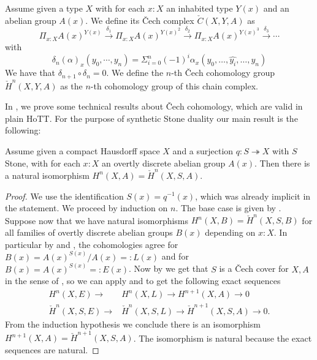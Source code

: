\begin{definition}\label{dfnCech}
Assume given a type $X$ with for each $x:X$ an inhabited type $Y(x)$ and an abelian group $A(x)$. We define its \v{C}ech complex $\check{C}(X,Y,A)$ as
\[\Pi_{x:X}A(x)^{Y(x)} \overset{\delta_1}{\longrightarrow} \Pi_{x:X}A(x)^{Y(x)^2} \overset{\delta_2}{\longrightarrow} \Pi_{x:X}A(x)^{Y(x)^3} \overset{\delta_3}{\longrightarrow} \cdots \]
with
\[\delta_n(\alpha)_x(y_0,\cdots,y_n) = \Sigma_{i=0}^n (-1)^i \alpha_x(y_0,\hdots,\hat{y_i},\hdots,y_n)\]
We have that $\delta_{n+1} \circ \delta_n = 0$.
%
We define the $n$-th \v{C}ech cohomology group $\check{H}^n(X,Y,A)$ as the $n$-th cohomology group of this chain complex.
\end{definition}

In , we prove some technical results about \v Cech cohomology, which are valid in plain HoTT. For the purpose of synthetic Stone duality our main result is the following:

\begin{theorem}\label{cech-and-sheaf-agree}
  Assume given a compact Hausdorff space $X$ and a surjection $q:S \twoheadrightarrow X$ with $S$ Stone, with for each $x:X$ an overtly discrete abelian group $A(x)$. Then there is a natural isomorphism $H^n(X,A) = \check H^n(X,S,A)$. 
\end{theorem}

\begin{proof}
  We use the identification $S(x) = q^{-1}(x)$, which was already implicit in the statement. We proceed by induction on $n$. The base case is given by . Suppose now that we have natural isomorphisms $H^n(X,B) = \check H^n(X,S,B)$ for all families of overtly discrete abelian groups $B(x)$ depending on $x:X$. In particular by  and , the cohomologies agree for $B(x) = A(x)^{S(x)}/A(x)=:L(x)$ and for $B(x) = A(x)^{S(x)}=:E(x)$. 
  Now by  we get that $S$ is a \v{C}ech cover for $X,A$ in the sense of , so we can apply  and  to get the following exact sequences
  \begin{align*}
    H^{n}(X,E) \to &H^{n}(X,L)\to H^{n+1}(X,A)\to 0\\
    \check{H}^{n}(X,S,E) \to &\check{H}^{n}(X,S,L)\to \check{H}^{n+1}(X,S,A)\to 0.
  \end{align*}
  From the induction hypothesis we conclude there is an isomorphism $H^{n+1}(X,A) = \check H^{n+1}(X,S,A)$. The isomorphism is natural because the exact sequences are natural.
\end{proof}

